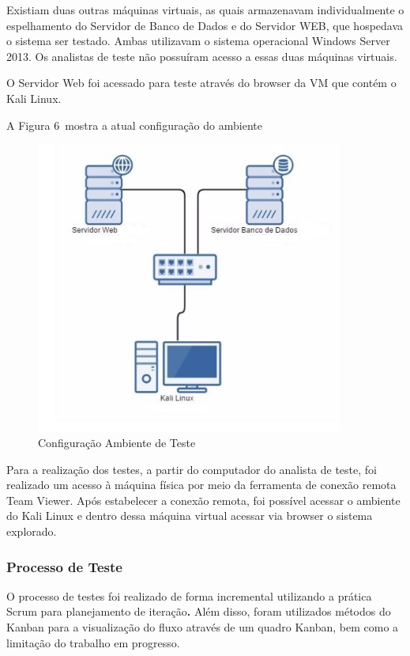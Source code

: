 \documentclass[
    12pt,               %
    openright,          %
    oneside,            %
    a4paper,            %
    section=TITLE,     %
    english,            %
    french,             %
    spanish,            %
    brazil              %
    ]{abntex2}
\begin{document}
Existiam duas outras máquinas virtuais, as quais armazenavam individualmente o espelhamento do Servidor de Banco de Dados e do Servidor WEB, que hospedava o sistema ser testado. Ambas utilizavam o sistema operacional Windows Server 2013. Os analistas de teste não possuíram acesso a essas duas máquinas virtuais.


O Servidor Web foi acessado para teste através do browser da VM que contém o Kali Linux.


A Figura 6~mostra a atual configuração do ambiente





\begin{figure}[htp]
\centering
\caption{Configuração Ambiente de Teste}
\includegraphics[width=382px]{imagearquiteturaambientedetestes.jpeg}
\end{figure}
\ifdefined\FloatBarrier \FloatBarrier \fi


Para a realização dos testes, a partir do computador do analista de teste, foi realizado um acesso à máquina física por meio da ferramenta de conexão remota Team Viewer. Após estabelecer a conexão remota, foi possível acessar o ambiente do Kali Linux e dentro dessa máquina virtual acessar via browser o sistema explorado.



\subsubsection*{Processo de Teste}

O processo de testes foi realizado de forma incremental utilizando a prática Scrum para planejamento de iteração\textbf{.} Além disso, foram utilizados métodos do Kanban para a visualização do fluxo através de um quadro Kanban, bem como a limitação do trabalho em progresso.
\end{document}
